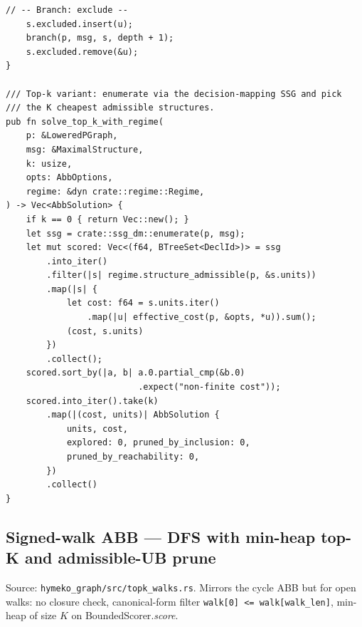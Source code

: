 \documentclass[11pt]{article}
\begin{document}
\begin{lstlisting}[style=ruststyle]
    // -- Branch: exclude --
    s.excluded.insert(u);
    branch(p, msg, s, depth + 1);
    s.excluded.remove(&u);
}

/// Top-k variant: enumerate via the decision-mapping SSG and pick
/// the K cheapest admissible structures.
pub fn solve_top_k_with_regime(
    p: &LoweredPGraph,
    msg: &MaximalStructure,
    k: usize,
    opts: AbbOptions,
    regime: &dyn crate::regime::Regime,
) -> Vec<AbbSolution> {
    if k == 0 { return Vec::new(); }
    let ssg = crate::ssg_dm::enumerate(p, msg);
    let mut scored: Vec<(f64, BTreeSet<DeclId>)> = ssg
        .into_iter()
        .filter(|s| regime.structure_admissible(p, &s.units))
        .map(|s| {
            let cost: f64 = s.units.iter()
                .map(|u| effective_cost(p, &opts, *u)).sum();
            (cost, s.units)
        })
        .collect();
    scored.sort_by(|a, b| a.0.partial_cmp(&b.0)
                          .expect("non-finite cost"));
    scored.into_iter().take(k)
        .map(|(cost, units)| AbbSolution {
            units, cost,
            explored: 0, pruned_by_inclusion: 0,
            pruned_by_reachability: 0,
        })
        .collect()
}
\end{lstlisting}

\subsection{Signed-walk ABB --- DFS with min-heap top-K and admissible-UB prune}
\label{app:code-walk-abb}

Source: \texttt{hymeko\_graph/src/topk\_walks.rs}. Mirrors the cycle
ABB but for open walks: no closure check, canonical-form filter
\texttt{walk[0] <= walk[walk\_len]}, min-heap of size $K$ on
\textsf{BoundedScorer}.\textit{score}.
\end{document}
